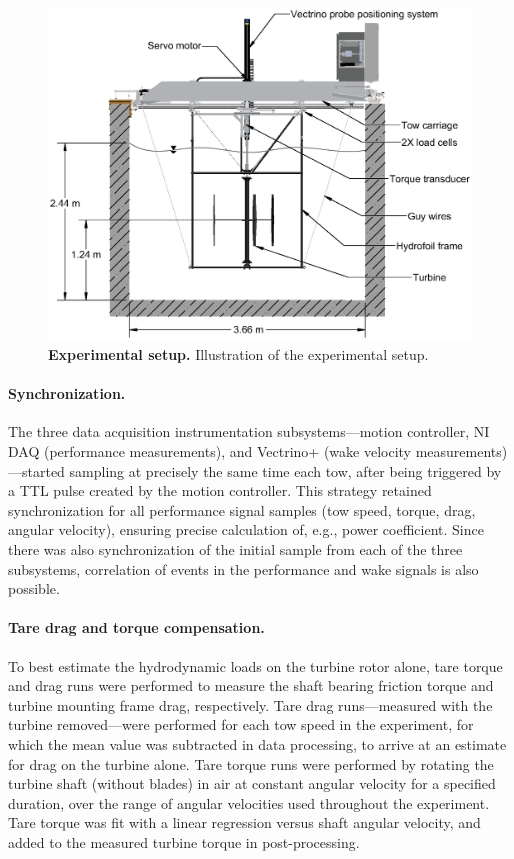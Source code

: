 \documentclass[10pt,letterpaper]{article}
\begin{document}
\begin{figure}[h]
    \centering

    \includegraphics[clip,trim=0.01in 0 0 0,
    width=\textwidth]{figures/tank_cross_section}

    \caption{{\bf Experimental setup.} Illustration of the experimental setup.}

    \label{fig:exp-setup}
\end{figure}

\paragraph{Synchronization.} The three data acquisition instrumentation
subsystems---motion controller, NI DAQ (performance measurements), and Vectrino+
(wake velocity measurements)---started sampling at precisely the same time each
tow, after being triggered by a TTL pulse created by the motion controller. This
strategy retained synchronization for all performance signal samples (tow speed,
torque, drag, angular velocity), ensuring precise calculation of, e.g., power
coefficient. Since there was also synchronization of the initial sample from
each of the three subsystems, correlation of events in the performance and wake
signals is also possible.

\paragraph{Tare drag and torque compensation.} To best estimate the hydrodynamic
loads on the turbine rotor alone, tare torque and drag runs were performed to
measure the shaft bearing friction torque and turbine mounting frame drag,
respectively. Tare drag runs---measured with the turbine removed---were
performed for each tow speed in the experiment, for which the mean value was
subtracted in data processing, to arrive at an estimate for drag on the turbine
alone. Tare torque runs were performed by rotating the turbine shaft (without
blades) in air at constant angular velocity for a specified duration, over the
range of angular velocities used throughout the experiment. Tare torque was fit
with a linear regression versus shaft angular velocity, and added to the
measured turbine torque in post-processing.
\end{document}
